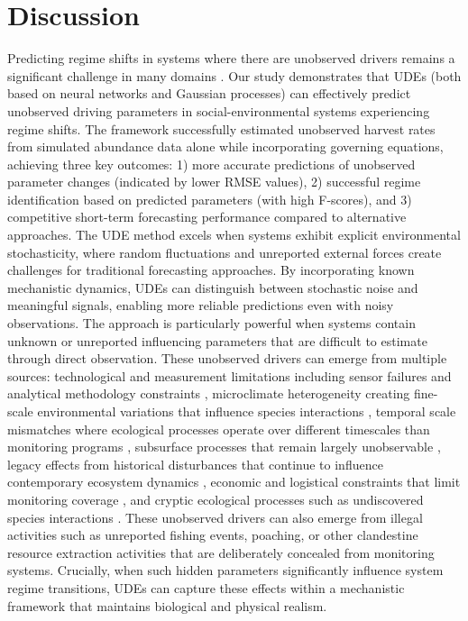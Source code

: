 \documentclass[openacc]{rsproca_new}%
\begin{document}
\section{Discussion}
\label{discussion}
Predicting regime shifts in systems where there are unobserved drivers remains a significant challenge in many domains \cite{dakos2015resilience, hamilton1989new, RegimeSwitching}. Our study demonstrates that UDEs (both based on neural networks and Gaussian processes) can effectively predict unobserved driving parameters in social-environmental systems experiencing regime shifts. The framework successfully estimated unobserved harvest rates from simulated abundance data alone while incorporating governing equations, achieving three key outcomes: 1) more accurate predictions of unobserved parameter changes (indicated by lower RMSE values), 2) successful regime identification based on predicted parameters (with high F-scores), and 3) competitive short-term forecasting performance compared to alternative approaches.
% 
The UDE method excels when systems exhibit explicit environmental stochasticity, where random fluctuations and unreported external forces create challenges for traditional forecasting approaches. By incorporating known mechanistic dynamics, UDEs can distinguish between stochastic noise and meaningful signals, enabling more reliable predictions even with noisy observations.
The approach is particularly powerful when systems contain unknown or unreported influencing parameters that are difficult to estimate through direct observation. These unobserved drivers can emerge from multiple sources: technological and measurement limitations including sensor failures and analytical methodology constraints \cite{rocke_modeling_2003, decorte_missing_2024}, microclimate heterogeneity creating fine-scale environmental variations that influence species interactions \cite{mislan_microclimate_2008}, temporal scale mismatches where ecological processes operate over different timescales than monitoring programs \cite{winkler_mismatches_2021}, subsurface processes that remain largely unobservable \cite{condon2021global}, legacy effects from historical disturbances that continue to influence contemporary ecosystem dynamics \cite{krause2020legacy}, economic and logistical constraints that limit monitoring coverage \cite{sparrow_effective_2020}, and cryptic ecological processes such as undiscovered species interactions \cite{bickford_cryptic_2007, uusitalo_hidden_2018}. These unobserved drivers can also emerge from illegal activities such as unreported fishing events, poaching, or other clandestine resource extraction activities that are deliberately concealed from monitoring systems. Crucially, when such hidden parameters significantly influence system regime transitions, UDEs can capture these effects within a mechanistic framework that maintains biological and physical realism.
\end{document}

